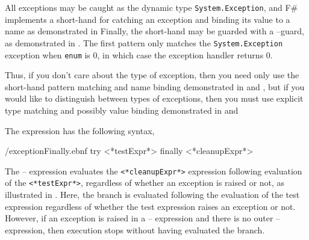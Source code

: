 \documentclass[fsharpnotes.tex]{subfiles}
\begin{document}
All exceptions may be caught as the dynamic type \lstinline{System.Exception}, and F\# implements a short-hand for catching an exception and binding its value to a name as demonstrated in 
%
%
Finally, the short-hand may be guarded with a --guard, as demonstrated in .
%
%
The first pattern only matches the \lstinline{System.Exception} exception when \lstinline{enum} is 0, in which case the exception handler returns 0.

Thus, if you don't care about the type of exception, then you need only use the short-hand pattern matching and name binding demonstrated in  and , but if you would like to distinguish between types of exceptions, then you must use explicit type matching and possibly value binding demonstrated in  and 

The  expression has the following syntax,
%
\begin{verbatimwrite}{\ebnf/exceptionFinally.ebnf}
try
   <*testExpr*>
finally
   <*cleanupExpr*>
\end{verbatimwrite}
%
The -- expression evaluates the \lstinline[language=syntax]{<*cleanupExpr*>} expression following evaluation of the \lstinline[language=syntax]{<*testExpr*>}, regardless of whether an exception is raised or not, as illustrated in .
%
%
Here, the  branch is evaluated following the evaluation of the test expression regardless of whether the test expression raises an exception or not. However, if an exception is raised in a -- expression and there is no outer -- expression, then execution stops without having evaluated the  branch.
\end{document}
